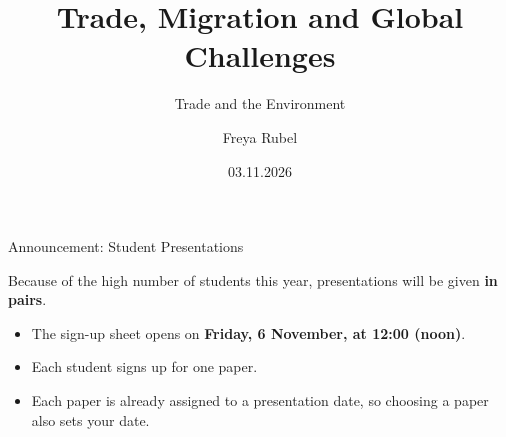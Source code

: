 \documentclass{beamer}
\author{Freya Rubel}
\title{Trade, Migration and Global Challenges}
\subtitle{Trade and the Environment}
\institute{}
\date{03.11.2026}
\begin{document}
\begin{frame}
    \titlepage
\end{frame}

\begin{frame}
    \tableofcontents[sectionstyle=show, subsectionstyle=show/shaded/hide, subsubsectionstyle=show/shaded/hide]
\end{frame}

\begin{frame}{Announcement: Student Presentations}
    \begin{tcolorbox}[colback=red!15, colframe=red!70!black]
        Because of the high number of students this year, presentations will be given \textbf{in pairs}.
        \begin{itemize}
            \item The sign-up sheet opens on \textbf{Friday, 6 November, at 12:00 (noon)}.
            \item Each student signs up for one paper.
            \item Each paper is already assigned to a presentation date, so choosing a paper also sets your date.
        \end{itemize}
    \end{tcolorbox}
\end{frame}
\end{document}
